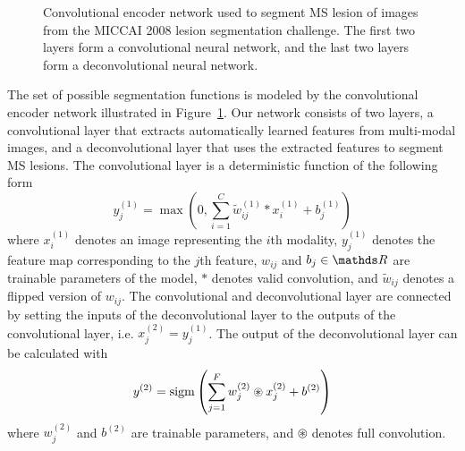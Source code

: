 \begin{figure}[tb]
\centering

\caption{Convolutional encoder network used to segment MS lesion of images from
the MICCAI 2008 lesion segmentation challenge. The first two layers form a
convolutional neural network, and the last two layers form a deconvolutional
neural network.}
\label{fig:network}
\end{figure}

The set of possible segmentation functions is modeled by the convolutional
encoder network illustrated in Figure~\ref{fig:network}. Our network consists of
two layers, a convolutional layer that extracts automatically learned features
from multi-modal images, and a deconvolutional layer that uses the extracted
features to segment MS lesions. The convolutional layer is a deterministic
function of the following form
\begin{equation}
y^{(1)}_j = \max \left(0, \sum_{i=1}^{C}\tilde{w}^{(1)}_{ij}*x^{(1)}_i +
b^{(1)}_j\right)
\end{equation}
where $x^{(1)}_i$ denotes an image representing the $i$th modality, 
$y^{(1)}_j$ denotes the feature map corresponding to the $j$th feature, $w_{ij}$
and $b_j \in \R$ are trainable parameters of the model, $*$ denotes
valid convolution, and $\tilde{w}_{ij}$ denotes a flipped version of $w_{ij}$.
The convolutional and deconvolutional layer are connected by setting the inputs
of the deconvolutional layer to the outputs of the convolutional layer, i.e.
$x^{(2)}_j = y^{(1)}_j$. The output of the deconvolutional layer can be
calculated with
\begin{equation}
y^{(2)} = \operatorname{sigm}\left(\sum_{j=1}^Fw^{(2)}_{j}\circledast x^{(2)}_j +
b^{(2)}\right)
\end{equation}
where $w^{(2)}_j$ and $b^{(2)}$ are trainable parameters, and $\circledast$
denotes full convolution.

